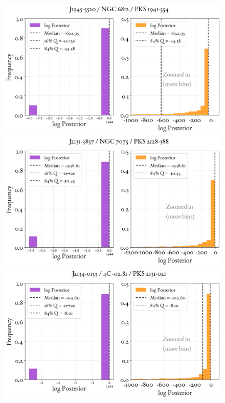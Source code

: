 \begin{figure}
    \centering
    \includegraphics[width=0.8\linewidth]{figures/ResultPosteriors/72_Posterior_4721.png}\\
     \includegraphics[width=0.8\linewidth]{figures/ResultPosteriors/77_Posterior_4818.png}\\
      \includegraphics[width=0.8\linewidth]{figures/ResultPosteriors/79_Posterior_4827.png}  
\end{figure}

